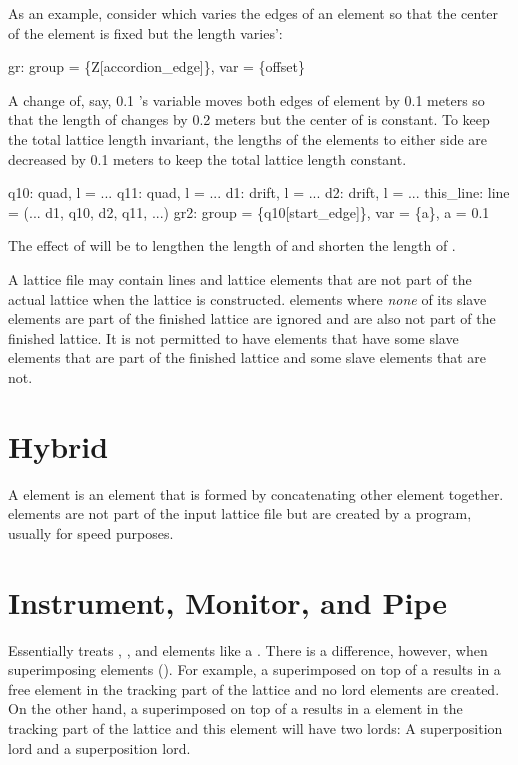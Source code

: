 As an example, consider  which varies the edges of
an element so that the center of the element is fixed but the length
varies':
\begin{example}
  gr: group = \{Z[accordion_edge]\}, var = \{offset\}
\end{example}
A change of, say, 0.1 's  variable moves both edges
of element  by 0.1 meters so that the length of  changes
by 0.2 meters but the center of  is constant. To keep the total
lattice length invariant, the lengths of the elements to either side
are decreased by 0.1 meters to keep the total lattice length constant.
\begin{example}
  q10: quad, l = ...
  q11: quad, l = ...
  d1: drift, l = ...
  d2: drift, l = ...
  this_line: line = (... d1, q10, d2, q11, ...)
  gr2: group = \{q10[start_edge]\}, var = \{a\}, a = 0.1
\end{example}
The effect of   will be to lengthen the length of
 and shorten the length of .

A lattice file may contain lines and lattice elements that are not
part of the actual lattice when the lattice is constructed. 
elements where {\em none} of its slave elements are part of the
finished lattice are ignored and are also not part of the finished
lattice. It is not permitted to have  elements that have
some slave elements that are part of the finished lattice and some
slave elements that are not.

\section{Hybrid}
\label{s:hybrid}

A  element is an element that is formed by concatenating
other element together.  elements are not part of the input
lattice file but are created by a program, usually for speed purposes.

\section{Instrument, Monitor, and Pipe}
\label{s:monitor}

Essentially \bmad treats , , and 
elements like a . There is a difference, however, when
superimposing elements (). For example, a
 superimposed on top of a  results in a free
 element in the tracking part of the lattice and no
lord elements are created. On the other hand, a 
superimposed on top of a  results in a 
element in the tracking part of the lattice and this 
element will have two lords: A  superposition lord and
a  superposition lord.

